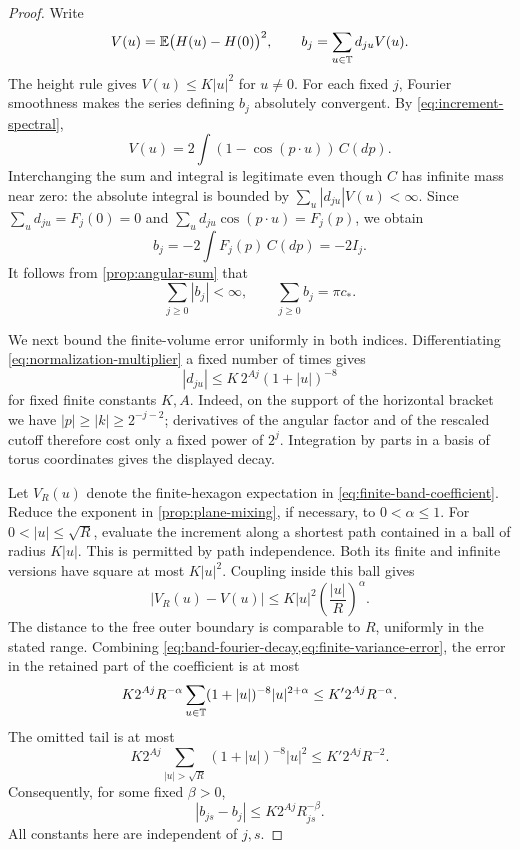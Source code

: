 \begin{proof}
Write
\[
 V(u)=\mathbb E\bigl(H(u)-H(0)\bigr)^2,\qquad
 b_j=\sum_{u\in\mathbb T}d_{ju}V(u).
\]
The height rule gives \(V(u)\le K|u|^2\) for \(u\ne0\). For each fixed \(j\),
Fourier smoothness makes the series defining \(b_j\) absolutely convergent.
By \cref{eq:increment-spectral},
\[
 V(u)=2\int(1-\cos(p\cdot u))\,C(dp).
\]
Interchanging the sum and integral is legitimate even though \(C\) has
infinite mass near zero: the absolute integral is bounded by
\(\sum_u|d_{ju}|V(u)<\infty\). Since
\(\sum_u d_{ju}=F_j(0)=0\) and
\(\sum_u d_{ju}\cos(p\cdot u)=F_j(p)\), we obtain
\begin{equation}
 \label{eq:band-inversion}
 b_j=-2\int F_j(p)\,C(dp)=-2I_j.
\end{equation}
It follows from \cref{prop:angular-sum} that
\begin{equation}
 \label{eq:infinite-band-sum}
 \sum_{j\ge0}|b_j|<\infty,
 \qquad \sum_{j\ge0}b_j=\pi c_*.
\end{equation}

We next bound the finite-volume error uniformly in both indices. Differentiating
\cref{eq:normalization-multiplier} a fixed number of times gives
\begin{equation}
 \label{eq:band-fourier-decay}
 |d_{ju}|\le K\,2^{Aj}(1+|u|)^{-8}
\end{equation}
for fixed finite constants \(K,A\). Indeed, on the support of the horizontal
bracket we have \(|p|\ge|k|\ge2^{-j-2}\); derivatives of the angular factor
and of the rescaled cutoff therefore cost only a fixed power of \(2^j\).
Integration by parts in a basis of torus coordinates gives the displayed
decay.

Let \(V_R(u)\) denote the finite-hexagon expectation in
\cref{eq:finite-band-coefficient}. Reduce the exponent in
\cref{prop:plane-mixing}, if necessary, to \(0<\alpha\le1\). For
\(0<|u|\le\sqrt R\), evaluate the increment along a shortest path contained
in a ball of radius \(K|u|\). This is permitted by path independence. Both
its finite and infinite versions have square at most \(K|u|^2\). Coupling
inside this ball gives
\begin{equation}
 \label{eq:finite-variance-error}
 |V_R(u)-V(u)|\le K|u|^2\left(\frac{|u|}{R}\right)^\alpha.
\end{equation}
The distance to the free outer boundary is comparable to \(R\), uniformly in
the stated range. Combining
\cref{eq:band-fourier-decay,eq:finite-variance-error}, the error in the retained
part of the coefficient is at most
\[
 K2^{Aj}R^{-\alpha}
       \sum_{u\in\mathbb T}(1+|u|)^{-8}|u|^{2+\alpha}
   \le K'2^{Aj}R^{-\alpha}.
\]
The omitted tail is at most
\[
 K2^{Aj}\sum_{|u|>\sqrt R}(1+|u|)^{-8}|u|^2
       \le K'2^{Aj}R^{-2}.
\]
Consequently, for some fixed \(\beta>0\),
\begin{equation}
 \label{eq:finite-band-error}
 |b_{js}-b_j|\le K2^{Aj}R_{js}^{-\beta}.
\end{equation}
All constants here are independent of \(j,s\).


\end{proof}

